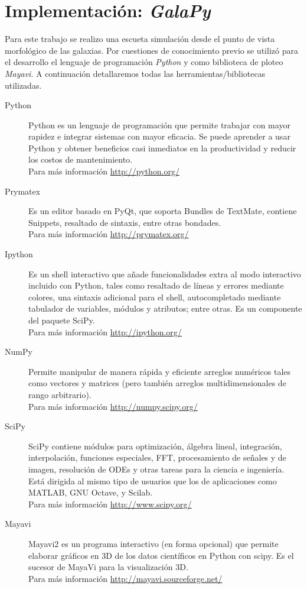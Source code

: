 \documentclass[12tp]{article}
\begin{document}
\section{Implementación: \emph{GalaPy}}
Para este trabajo se realizo una escueta simulación desde el punto de vista morfológico de las galaxias. Por cuestiones de conocimiento
previo se utilizó para el desarrollo el lenguaje de programación \emph{Python} y como biblioteca de ploteo \emph{Mayavi}. A continuación 
detallaremos todas las herramientas/bibliotecas utilizadas.
\begin{description}
    \item[Python] Python es un lenguaje de programación que permite trabajar con mayor rapidez e integrar sistemas con mayor eficacia. 
    Se puede aprender a usar Python y obtener beneficios casi inmediatos en la productividad y reducir los costos de mantenimiento.\\
    Para más información \url{http://python.org/}
    \item[Prymatex] Es un editor basado en PyQt, que soporta Bundles de TextMate, contiene Snippets, resaltado de sintaxis, entre otras
        bondades.\\
        Para más información \url{http://prymatex.org/}  
    \item[Ipython] Es un shell interactivo que añade funcionalidades extra al modo interactivo incluido con Python, tales como resaltado de líneas y errores mediante colores, una sintaxis adicional para el shell, autocompletado mediante tabulador de variables, módulos y atributos; entre otras. Es un componente del paquete SciPy.\\
    Para más información  \url{http://ipython.org/}
    \item[NumPy] Permite manipular de manera rápida y eficiente arreglos numéricos tales como vectores y matrices (pero también arreglos multidimensionales de rango arbitrario).\\
       Para más información \url{http://numpy.scipy.org/}
    \item[SciPy] SciPy contiene módulos para optimización, álgebra lineal, integración, interpolación, 
       funciones especiales, FFT, procesamiento de señales y de imagen, resolución de ODEs y otras tareas 
       para la ciencia e ingeniería. Está dirigida al mismo tipo de usuarios que los de aplicaciones como MATLAB, GNU Octave, y Scilab.\\
       Para más información \url{http://www.scipy.org/}
    \item[Mayavi] Mayavi2 es un programa interactivo (en forma opcional) que permite elaborar gráficos en 3D de los datos 
    científicos en Python con scipy. Es el sucesor de MayaVi para la visualización 3D.\\
    Para más información \url{http://mayavi.sourceforge.net/}
\end{description}
\end{document}
